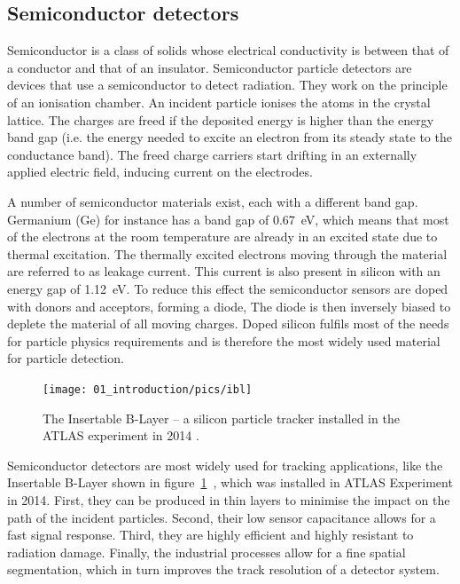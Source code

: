 

\subsection{Semiconductor detectors}
Semiconductor is a class of solids whose electrical conductivity is between that of a conductor and that of an insulator. Semiconductor particle detectors are devices that use a semiconductor to detect radiation. They work on the principle of an ionisation chamber. An incident particle ionises the atoms in the crystal lattice. The charges are freed if the deposited energy is higher than the energy band gap (i.e. the energy needed to excite an electron from its steady state to the conductance band). The freed charge carriers start drifting in an externally applied electric field, inducing current on the electrodes. 

A number of semiconductor materials exist, each with a different band gap. Germanium (Ge) for instance has a band gap of 0.67~eV, which means that most of the electrons at the room temperature are already in an excited state due to thermal excitation. The thermally excited electrons moving through the material are referred to as leakage current. This current is also present in silicon with an energy gap of 1.12~eV. To reduce this effect the semiconductor sensors are doped with donors and acceptors, forming a diode, The diode is then inversely biased to deplete the material of all moving charges. Doped silicon fulfils most of the needs for particle physics requirements and is therefore the most widely used material for particle detection.

\begin{figure}[!t]
\centering
\texttt{[image: 01\_introduction/pics/ibl]}
\caption{The Insertable B-Layer -- a silicon particle tracker installed in the ATLAS experiment in 2014 \cite{MarcelloniDeOliveira:1702006}.}
\label{fig:ibl}
\end{figure}

Semiconductor detectors are most widely used for tracking applications, like the Insertable B-Layer shown in figure~\ref{fig:ibl}~\cite{Pernegger:1985432}, which was installed in ATLAS Experiment in 2014. First, they can be produced in thin layers to minimise the impact on the path of the incident particles. Second, their low sensor capacitance allows for a fast signal response. Third, they are highly efficient and highly resistant to radiation damage. Finally, the industrial processes allow for a fine spatial segmentation, which in turn improves the track resolution of a detector system. 

